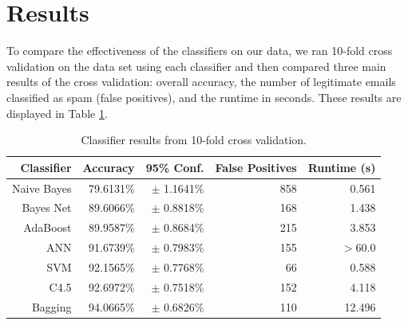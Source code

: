 \documentclass[11pt,oneside,reqno]{amsart}
\theoremstyle{definition}
\theoremstyle{definition}
\theoremstyle{remark}
\numberwithin{equation}{section}
\numberwithin{equation}{section}
\begin{document}
\section{Results}
To compare the effectiveness of the classifiers on our data, we ran 10-fold cross validation on the data set using each classifier and then compared three main results of the cross validation: overall accuracy, the number of legitimate emails classified as spam (false positives), and the runtime in seconds. These results are displayed in Table \ref{table:results}.
\begin{table}[H]
\centering
\begin{tabular}{r | r r r r}
	Classifier & Accuracy & 95\% Conf. & False Positives & Runtime (s) \\ \hline
	Naive Bayes & 79.6131\% &\(\pm\) 1.1641\%& 858 & 0.561\\
	Bayes Net & 89.6066\% &\(\pm\) 0.8818\%& 168 & 1.438\\
	AdaBoost & 89.9587\% &\(\pm\) 0.8684\%& 215 & 3.853\\
	ANN & 91.6739\% &\(\pm\) 0.7983\%& 155 & \(>\)60.0\\
	SVM & 92.1565\% &\(\pm\) 0.7768\%& 66 & 0.588\\
	C4.5 & 92.6972\% &\(\pm\) 0.7518\%& 152 & 4.118\\
	Bagging & 94.0665\% & \(\pm\) 0.6826\% & 110 & 12.496
\end{tabular}
\caption{Classifier results from 10-fold cross validation.}
\label{table:results}
\end{table}
\end{document}
